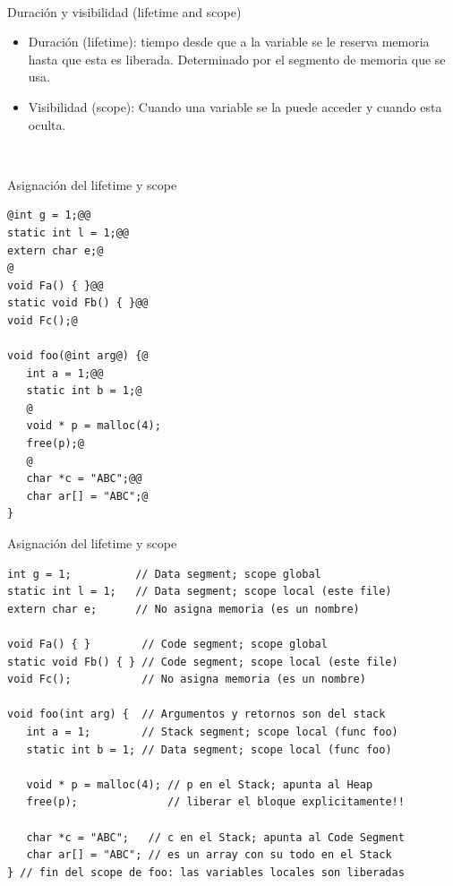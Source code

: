 ~%
\begin{frame}[fragile,label=LS]{Duraci\'on y visibilidad (lifetime and scope)}
   \begin{itemize}
       \item<1-> Duraci\'on (lifetime): tiempo desde que a la variable se le reserva memoria hasta que esta es liberada. Determinado por el segmento de memoria que se usa.
       \item<2-> Visibilidad (scope): Cuando una variable se la puede acceder y cuando esta oculta.
   \end{itemize}
\end{frame}


~%
\begin{frame}[fragile]{Asignaci\'on del lifetime y scope}
         \begin{lstlisting}[style=dimmided]
@int g = 1;@@
static int l = 1;@@
extern char e;@
@
void Fa() { }@@
static void Fb() { }@@
void Fc();@

void foo(@int arg@) {@
   int a = 1;@@
   static int b = 1;@
   @
   void * p = malloc(4);
   free(p);@
   @
   char *c = "ABC";@@
   char ar[] = "ABC";@
}
         \end{lstlisting}
\end{frame}
\begin{frame}[fragile]{Asignaci\'on del lifetime y scope}
         \begin{lstlisting}[style=normal]
int g = 1;          // Data segment; scope global
static int l = 1;   // Data segment; scope local (este file)
extern char e;      // No asigna memoria (es un nombre)

void Fa() { }        // Code segment; scope global
static void Fb() { } // Code segment; scope local (este file)
void Fc();           // No asigna memoria (es un nombre)

void foo(int arg) {  // Argumentos y retornos son del stack
   int a = 1;        // Stack segment; scope local (func foo)
   static int b = 1; // Data segment; scope local (func foo)

   void * p = malloc(4); // p en el Stack; apunta al Heap
   free(p);              // liberar el bloque explicitamente!!

   char *c = "ABC";   // c en el Stack; apunta al Code Segment
   char ar[] = "ABC"; // es un array con su todo en el Stack
} // fin del scope de foo: las variables locales son liberadas
         \end{lstlisting}
\end{frame}
